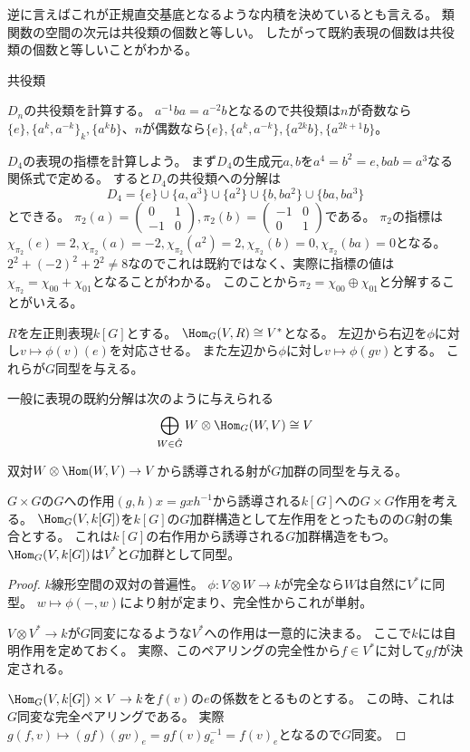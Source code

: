 \documentclass{jsarticle}
\begin{document}
逆に言えばこれが正規直交基底となるような内積を決めているとも言える。
類関数の空間の次元は共役類の個数と等しい。
したがって既約表現の個数は共役類の個数と等しいことがわかる。
\begin{dfn}
共役類
\end{dfn}
$D_n$の共役類を計算する。
$a^{-1}ba=a^{-2}b$となるので共役類は$n$が奇数なら$\{e\}, \{a^k,a^{-k}\}_k,\{a^kb\}$、$n$が偶数なら$\{e\}, \{a^k,a^{-k}\}, \{a^{2k}b\}, \{a^{2k+1}b\}$。
\begin{eg}
$D_4$の表現の指標を計算しよう。
まず$D_4$の生成元$a, b$を$a^4=b^2=e, bab=a^3$なる関係式で定める。
すると$D_4$の共役類への分解は
\[
D_4=\{e\}\cup\{a, a^3\}\cup\{a^2\}\cup\{b,ba^2\}\cup\{ba,ba^3\}
\]
とできる。
$\pi_2(a)=\begin{pmatrix}0&1\\-1&0\end{pmatrix}, \pi_2(b)=\begin{pmatrix}-1&0\\0&1\end{pmatrix}$である。
$\pi_2$の指標は$\chi_{\pi_2}(e)=2, \chi_{\pi_2}(a)=-2, \chi_{\pi_2}(a^2)=2, \chi_{\pi_2}(b)=0, \chi_{\pi_2}(ba)=0$となる。
$2^2+(-2)^2+2^2\neq8$なのでこれは既約ではなく、実際に指標の値は$\chi_{\pi_2}=\chi_{00}+\chi_{01}$となることがわかる。
このことから$\pi_2=\chi_{00}\oplus\chi_{01}$と分解することがいえる。
\end{eg}


$R$を左正則表現$k[G]$とする。
$\Hom_G(V,R)\cong V^*$となる。
左辺から右辺を$\phi$に対し$v\mapsto\phi(v)(e)$を対応させる。
また左辺から$\phi$に対し$v\mapsto\phi(gv)$とする。
これらが$G$同型を与える。

\begin{thm}
一般に表現の既約分解は次のように与えられる
\[
\bigoplus_{W\in\hat{G}}W\otimes \Hom_G(W,V)\cong V
\]
\end{thm}
双対$W\otimes\Hom(W,V)\to V$から誘導される射が$G$加群の同型を与える。
\begin{lem}
$G\times G$の$G$への作用$(g,h)x=gxh^{-1}$から誘導される$k[G]$への$G\times G$作用を考える。
$\Hom_G(V,k[G])$を$k[G]$の$G$加群構造として左作用をとったものの$G$射の集合とする。
これは$k[G]$の右作用から誘導される$G$加群構造をもつ。
$\Hom_G(V,k[G])$は$V^*$と$G$加群として同型。
\end{lem}
\begin{proof}
$k$線形空間の双対の普遍性。
$\phi\colon V\otimes W\to k$が完全なら$W$は自然に$V^*$に同型。
$w\mapsto\phi(-,w)$により射が定まり、完全性からこれが単射。

$V\otimes V^*\to k$が$G$同変になるような$V^*$への作用は一意的に決まる。
ここで$k$には自明作用を定めておく。
実際、このペアリングの完全性から$f\in V^*$に対して$gf$が決定される。

$\Hom_G(V,k[G])\times V\to k$を$f(v)$の$e$の係数をとるものとする。
この時、これは$G$同変な完全ペアリングである。
実際$g(f,v)\mapsto(gf)(gv)_e=gf(v)g^{-1}_e=f(v)_e$となるので$G$同変。
\end{proof}
\end{document}
